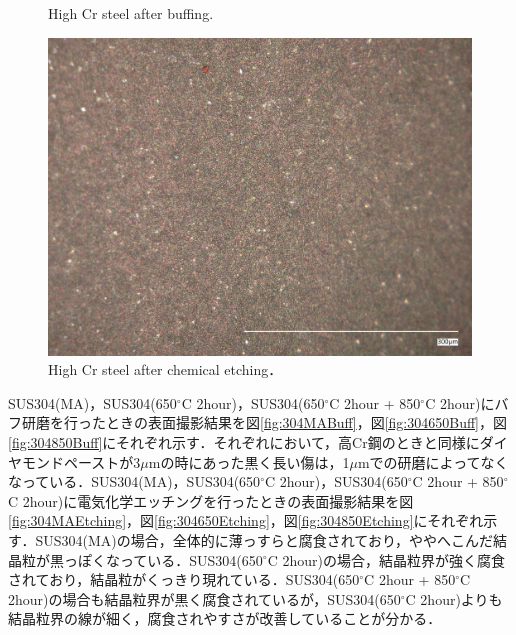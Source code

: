 \begin{figure}[htbp]
\begin{minipage}[htbp]{0.45\linewidth}
      \label{fig:Cr1um}
    \end{minipage}
    \centering
    \caption{High Cr steel after buffing.}
    \label{fig:CrBuff}
\end{figure} 
\clearpage
\begin{figure}[htbp]
    \centering %
    \includegraphics[width=100truemm,clip]{fig/241218_9Cr_etching.jpg}
    \caption{High Cr steel after chemical etching．}
    \label{fig:CrEtching}
\end{figure}

SUS304(MA)，SUS304(650$^\circ$C 2hour)，SUS304(650$^\circ$C 2hour + 850$^\circ$C 2hour)にバフ研磨を行ったときの表面撮影結果を図\ref{fig:304MABuff}，図\ref{fig:304650Buff}，図\ref{fig:304850Buff}にそれぞれ示す．それぞれにおいて，高Cr鋼のときと同様にダイヤモンドペーストが3$\mu$mの時にあった黒く長い傷は，1$\mu$mでの研磨によってなくなっている．SUS304(MA)，SUS304(650$^\circ$C 2hour)，SUS304(650$^\circ$C 2hour + 850$^\circ$C 2hour)に電気化学エッチングを行ったときの表面撮影結果を図\ref{fig:304MAEtching}，図\ref{fig:304650Etching}，図\ref{fig:304850Etching}にそれぞれ示す．SUS304(MA)の場合，全体的に薄っすらと腐食されており，ややへこんだ結晶粒が黒っぽくなっている．SUS304(650$^\circ$C 2hour)の場合，結晶粒界が強く腐食されており，結晶粒がくっきり現れている．SUS304(650$^\circ$C 2hour + 850$^\circ$C 2hour)の場合も結晶粒界が黒く腐食されているが，SUS304(650$^\circ$C 2hour)よりも結晶粒界の線が細く，腐食されやすさが改善していることが分かる．


